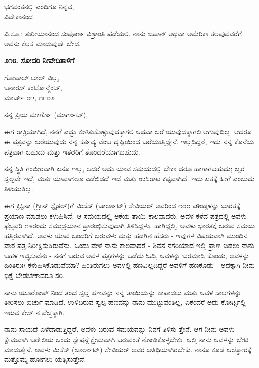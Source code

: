 \begin{flushright}
ಭಗವಂತನಲ್ಲಿ ಎಂದಿಗೂ ನಿನ್ನವ,\\ವಿವೇಕಾನಂದ
\end{flushright}

ವಿ.ಸೂ.: ತುರೀಯಾನಂದ ಸಂಪೂರ್ಣ ವಿಶ್ರಾಂತಿ ಪಡೆಯಲಿ. ನಾನು ಜಪಾನ್ ಅಥವಾ ಅಮೆರಿಕಾ ತಲಪುವವರೆಗೆ ಅವನು ಕೆಲಸ ಮಾಡುವುದೇ ಬೇಡ.

\begin{center}
\textbf{೨೧೮. ಸೋದರಿ ನೀವೇದಿತಾಳಿಗೆ}
\end{center}

\begin{flushright}
ಗೋಪಾಲ್ ಲಾಲ್ ವಿಲ್ಲ,\\ಬನಾರಸ್ ಕಂಟೋನ್ಮೆಂಟ್,\\ಮಾರ್ಚ್ ೦೪, ೧೯೦೨
\end{flushright}

ನನ್ನ ಪ್ರಿಯ ಮಾರ್ಗೊ (ಮಾರ್ಗಾಟ್),

ಈಗ ರಾತ್ರಿಯಾಗಿದೆ, ನನಗೆ ಎದ್ದು ಕುಳಿತುಕೊಳ್ಳುವುದಕ್ಕಾಗಲಿ ಅಥವಾ ಬರೆ ಯುವುದಕ್ಕಾಗಲಿ ಆಗುವುದಿಲ್ಲ. ಆದರೂ ಈ ಪತ್ರವನ್ನು ಬರೆಯುವುದು ನನ್ನ ಕರ್ತವ್ಯ ವೆಂಬ ದೃಷ್ಟಿಯಿಂದ ಬರೆಯುತ್ತಿದ್ದೇನೆ. ಇಲ್ಲದಿದ್ದರೆ, ಇದು ನನ್ನ ಕೊನೆಯ ಪತ್ರವಾಗ ಬಹುದು ಮತ್ತು ಇತರರಿಗೆ ತೊಂದರೆಯಾಗಬಹುದು.

ನನ್ನ ಸ್ಥಿತಿ ಗಂಭೀರವಾಗಿ ಏನೂ ಇಲ್ಲ, ಆದರೆ ಅದು ಯಾವ ಸಮಯದಲ್ಲಿ ಬೇಕಾ ದರೂ ಹಾಗಾಗಬಹುದು; ಜ್ವರ ಸ್ವಲ್ಪವೇ ಇದೆ, ಮತ್ತು ಯಾವಾಗಲೂ ಎಡೆಬಿಡದೆ ಇದೆ ಮತ್ತು ಉಸಿರಾಟ ಕಷ್ಟವಾಗಿದೆ. ಇದು ಏತಕ್ಕೆ ಹೀಗೆ ಎಂಬುದು ತಿಳಿಯುತ್ತಿಲ್ಲ.

ಈಗ ಕ್ರಿಸ್ಟಿನಾ (ಗ್ರೀನ್ ಸ್ಟೈಡಲ್)ಗೆ ಮಿಸೆಸ್ (ಚಾರ್ಲಾಟ್) ಸೇವಿಯರ್ ಅವರಿಂದ ೧೦೦ ಪೌಂಡ್ಗಳನ್ನು ಭಾರತಕ್ಕೆ ಪ್ರಯಾಣ ಮಾಡಲು ಕಳುಹಿಸಿದೆ. ಆ ಸಮಯದಲ್ಲಿ ಆಕೆಯ ತಾಯಿ ಕಾಲವಾದರು. ಅವಳ ಕಳೆದ ಪತ್ರದಲ್ಲಿ ಅವಳು ಫೆಬ್ರವರಿ ೧೫ರಂದು ಸಮುದ್ರಯಾನ ಪ್ರಾರಂಭಿಸುವುದಾಗಿ ತಿಳಿಸಿದ್ದಳು. ಹಾಗಿದ್ದಲ್ಲಿ, ಅವಳು ಭಾರತಕ್ಕೆ ಬರುವ ಸಮಯ ಹತ್ತಿರವಾಗಿದೆ. ಅವಳು ಯಾವ ಬಂದರಿಗೆ ಬರುವಳು ಮತ್ತು ಹಡಗಿನ ಹೆಸರು - ಇವುಗಳ ವಿಷಯವಾಗಿ ಮುಂದಿನ ವಾರ ಪತ್ರ ನಿರೀಕ್ಷಿಸುತ್ತಿರುವೆನು. ಒಂದು ವೇಳೆ ನಾನು ಕಾಲವಾದರೆ - ಶಿವನ ನಗರಿಯಾದ ಇಲ್ಲಿ ಪ್ರಾಣ ಬಿಡಲು ನಾನು ಬಹಳ ಇಚ್ಛಿಸುವೆನು - ನನಗೆ ಬರುವ ಅವಳ ಪತ್ರಗಳನ್ನು ಒಡೆದು ಓದಿ, ಅವಳನ್ನು ಬರಮಾಡಿ ಕೊಂಡು, ಅವಳನ್ನು ಹಿಂತಿರುಗಿ ಕಳುಹಿಸಿಕೊಡುವೆಯಾ? ಹಿಂತಿರುಗಲು ಅವಳಲ್ಲಿ ಹಣವಿಲ್ಲದಿದ್ದರೆ ಅವಳಿಗೆ ಹಣಕೊಡು - ಅದಕ್ಕಾಗಿ ನೀನು ಭಿಕ್ಷೆ ಬೇಡಬೇಕಾದರೂ ಸರಿ.

ನಾನು ಯೂರೋಪ್ ನಿಂದ ತಂದ ಸ್ವಲ್ಪ ಹಣವನ್ನು ನನ್ನ ತಾಯಿಯನ್ನು ಕಾಪಾಡಲು ಮತ್ತು ಅವಳ ಸಾಲಗಳನ್ನು ತೀರಿಸಲು ಖರ್ಚು ಮಾಡಿದೆ. ಉಳಿದಿರುವ ಸ್ವಲ್ಪ ಹಣವನ್ನು ನಾನು ಮುಟ್ಟುವಂತಿಲ್ಲ, ಏಕೆಂದರೆ ಅದು ಕೋರ್ಟ್ನಲ್ಲಿ ಇರುವ ಕೇಸ್ ನ ವೆಚ್ಚಕ್ಕಾಗಿ.

ನಾನು ಸಾಯದೆ ಎಳೆದಾಡುತ್ತಿದ್ದರೆ, ಅವಳು ಬರುವ ಸಮಯವನ್ನು ನಿನಗೆ ತಿಳಿಸು ತ್ತೇನೆ. ಆಗ ನೀನು ಅವಳು ಕ್ಷೇಮವಾಗಿ ಬರೇಲಿಯ ಒಂದು ಸ್ಟೇಷನ್ಗೆ ಕ್ಷೇಮವಾಗಿ ಬರುವಂತೆ ನೋಡಿಕೊಳ್ಳಬೇಕು. ಅಲ್ಲಿ ನಾನು ಅವಳನ್ನು ಭೇಟಿ ಮಾಡುತ್ತೇನೆ. ಅವಳು ಮಿಸೆಸ್ (ಚಾರ್ಲಾಟ್) ಸೇವಿಯರ್ ಅವರ ಅತಿಥಿಯಾಗಿರಬೇಕು. ನಾನೂ ಕೂಡ ಆಲ್ಮೋರಕ್ಕೆ ಮತ್ತೊಮ್ಮೆ ಹೋಗಲು ಯತ್ನಿಸುತ್ತೇನೆ.

